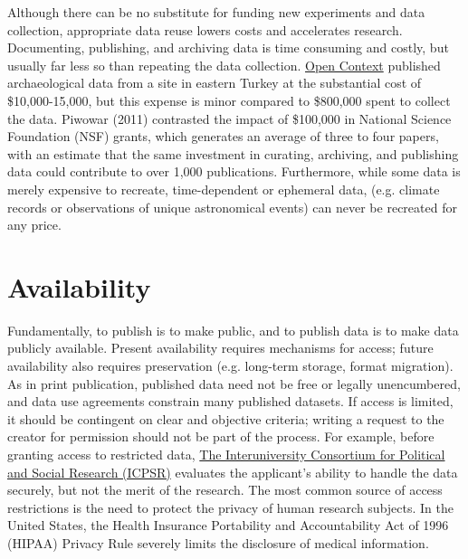 \documentclass[10pt,a4paper,twocolumn]{article}
\begin{document}
Although there can be no substitute for funding new experiments and data collection, appropriate data reuse lowers costs and accelerates research.
Documenting, publishing, and archiving data is time consuming and costly, but usually far less so than repeating the data collection.
\href{http://opencontext.org/}{Open Context} published archaeological data from a site in eastern Turkey at the substantial cost of \$10,000-15,000, but this expense is minor compared to \$800,000 spent to collect the data\cite{kansa_we_2013}.
Piwowar (2011) contrasted the impact of \$100,000 in National Science Foundation (NSF) grants, which generates an average of three to four papers, with an estimate that the same investment in curating, archiving, and publishing data could contribute to over 1,000 publications\cite{piwowar_data_2011}.
Furthermore, while some data is merely expensive to recreate, time-dependent or ephemeral data, (e.g. climate records or observations of unique astronomical events) can never be recreated for any price\cite{gray_online_2002}.

\section*{Availability}\label{availability}

Fundamentally, to publish is to make public, and to publish data is to make data publicly available.
Present availability requires mechanisms for access; future availability also requires preservation (e.g. long-term storage, format migration)\cite{waters_preserving_1996, beagrie_digital_2008, gray_online_2002}.
As in print publication, published data need not be free or legally unencumbered, and data use agreements constrain many published datasets.
If access is limited, it should be contingent on clear and objective criteria; writing a request to the creator for permission should not be part of the process.
For example, before granting access to restricted data, \href{http://www.icpsr.umich.edu/icpsrweb/content/deposit/confidentiality.html}{The Interuniversity Consortium for Political and Social Research (ICPSR)} evaluates the applicant's ability to handle the data securely, but not the merit of the research.
The most common source of access restrictions is the need to protect the privacy of human research subjects.
In the United States, the Health Insurance Portability and Accountability Act of 1996 (HIPAA) Privacy Rule severely limits the disclosure of medical information\cite{office_for_civil_rights_renal_2003}.
\end{document}
